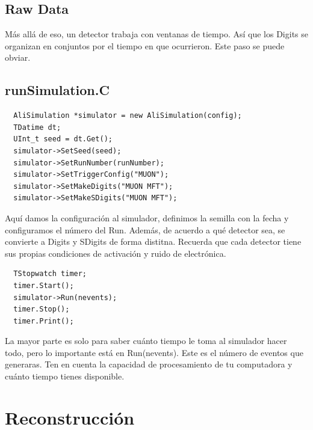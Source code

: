 \documentclass{article}
\begin{document}
\subsection{Raw Data}

M\'as all\'a de eso, un detector trabaja con ventanas de tiempo. As\'i que los Digits se organizan en conjuntos por el tiempo en que ocurrieron. Este paso se puede obviar.

\subsection{runSimulation.C}

\begin{tcolorbox}[breakable]
\begin{verbatim}
  AliSimulation *simulator = new AliSimulation(config);
  TDatime dt;
  UInt_t seed = dt.Get();
  simulator->SetSeed(seed);
  simulator->SetRunNumber(runNumber);
  simulator->SetTriggerConfig("MUON");
  simulator->SetMakeDigits("MUON MFT");
  simulator->SetMakeSDigits("MUON MFT");
\end{verbatim}
\end{tcolorbox}

Aqu\'i damos la configuraci\'on al simulador, definimos la semilla con la fecha y configuramos el n\'umero del Run. Adem\'as, de acuerdo a qu\'e detector sea, se convierte a Digits y SDigits de forma distitna. Recuerda que cada detector tiene sus propias condiciones de activaci\'on y ruido de electr\'onica.

\begin{tcolorbox}[breakable]
\begin{verbatim}
  TStopwatch timer;
  timer.Start();
  simulator->Run(nevents);
  timer.Stop();
  timer.Print();
\end{verbatim}
\end{tcolorbox}
La mayor parte es solo para saber cu\'anto tiempo le toma al simulador hacer todo, pero lo importante est\'a en Run(nevents). Este es el n\'umero de eventos que generaras. Ten en cuenta la capacidad de procesamiento de tu computadora y cu\'anto tiempo tienes disponible.

\newpage

\section{Reconstrucci\'on}
\end{document}
